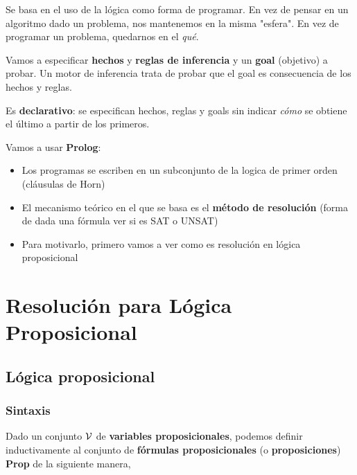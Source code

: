\documentclass{report}
\theoremstyle{definition} %
\begin{document}
Se basa en el uso de la lógica como forma de programar. En vez de pensar en un
algoritmo dado un problema, nos mantenemos en la misma "esfera". En vez de
programar un problema, quedarnos en el \textit{qué}.

Vamos a especificar \textbf{hechos} y \textbf{reglas de inferencia} y un
\textbf{goal} (objetivo) a probar. Un motor de inferencia trata de probar que el
goal es consecuencia de los hechos y reglas.

Es \textbf{declarativo}: se especifican hechos, reglas y goals sin indicar
\textit{cómo} se obtiene el último a partir de los primeros.

Vamos a usar \textbf{Prolog}:

\begin{itemize}
    \item Los programas se escriben en un subconjunto de la logica de primer
    orden (cláusulas de Horn)
    \item El mecanismo teórico en el que se basa es el \textbf{método de
    resolución} (forma de dada una fórmula ver si es SAT o UNSAT)
    \item Para motivarlo, primero vamos a ver como es resolución en lógica
    proposicional
\end{itemize}

\section{Resolución para Lógica Proposicional}

\subsection{Lógica proposicional}

\subsubsection{Sintaxis}

Dado un conjunto $\mathcal{V}$ de \textbf{variables proposicionales}, podemos
definir inductivamente al conjunto de \textbf{fórmulas proposicionales} (o
\textbf{proposiciones}) \textbf{Prop} de la siguiente manera,
\end{document}
